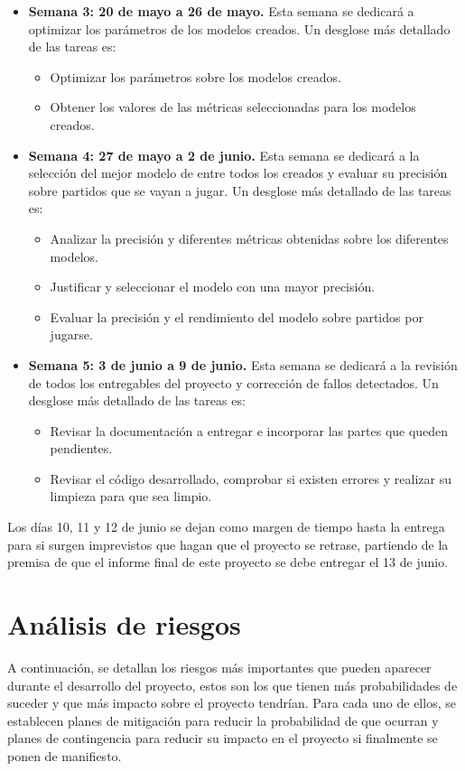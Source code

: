 \begin{itemize}
  \item \textbf{Semana 3: 20 de mayo a 26 de mayo.}
  Esta semana se dedicará a optimizar los parámetros de los modelos creados. Un desglose más detallado de las tareas es:
  \begin{itemize}
    \item Optimizar los parámetros sobre los modelos creados.
    \item Obtener los valores de las métricas seleccionadas para los modelos creados.
  \end{itemize}

  \item \textbf{Semana 4: 27 de mayo a 2 de junio.}
  Esta semana se dedicará a la selección del mejor modelo de entre todos los creados y evaluar su precisión sobre partidos que se vayan a jugar. Un desglose más detallado de las tareas es:
  \begin{itemize}
    \item Analizar la precisión y diferentes métricas obtenidas sobre los diferentes modelos.
    \item Justificar y seleccionar el modelo con una mayor precisión.
    \item Evaluar la precisión y el rendimiento del modelo sobre partidos por jugarse.
  \end{itemize}

  \item \textbf{Semana 5: 3 de junio a 9 de junio.}
  Esta semana se dedicará a la revisión de todos los entregables del proyecto y corrección de fallos detectados. Un desglose más detallado de las tareas es:
  \begin{itemize}
    \item Revisar la documentación a entregar e incorporar las partes que queden pendientes.
    \item Revisar el código desarrollado, comprobar si existen errores y realizar su limpieza para que sea limpio.
  \end{itemize}
  
  \end{itemize}

  Los días 10, 11 y 12 de junio se dejan como margen de tiempo hasta la entrega para si surgen imprevistos que hagan que el proyecto se retrase, partiendo de la premisa de que el informe final de este proyecto se debe entregar el 13 de junio.



\section{Análisis de riesgos}
A continuación, se detallan los riesgos más importantes que pueden aparecer durante el desarrollo del proyecto, estos son los que tienen más probabilidades de suceder y que más impacto sobre el proyecto tendrían. Para cada uno de ellos, se establecen planes de mitigación para reducir la probabilidad de que ocurran y planes de contingencia para reducir su impacto en el proyecto si finalmente se ponen de manifiesto.







